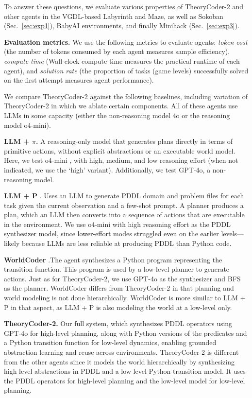 \documentclass{article}
\theoremstyle{plain}
\theoremstyle{definition}
\theoremstyle{remark}
\begin{document}
To answer these questions, we evaluate various properties of TheoryCoder-2 and other agents in the VGDL-based Labyrinth and Maze, as well as Sokoban (Sec.~\ref{sec:exp1}), BabyAI  environments, and finally Minihack (Sec.~\ref{sec:exp3}).

\textbf{Evaluation metrics.} We use the following metrics to evaluate agents:
\textit{token cost} (the number of tokens consumed by each agent measures sample efficiency),  \textit{compute time} (Wall-clock compute time measures the practical runtime of each agent), and \textit{solution rate} (the proportion of tasks (game levels) successfully solved on the first attempt measures agent performance).

We compare TheoryCoder-2 against the following baselines, including variation of TheoryCoder-2 in which we ablate certain components.
All of these agents use LLMs in some capacity (either the non-reasoning model 4o or the reasoning model o4-mini).

\textbf{LLM + \textbf{$\pi$}.} A reasoning-only model that generates plans directly in terms of primitive actions, without explicit abstractions or an executable world model. Here, we test o4-mini \citep{openai_o4mini_system_card_2025}, with high, medium, and low reasoning effort (when not indicated, we use the `high' variant). Additionally, we test GPT-4o, a non-reasoning model.

\textbf{LLM + P} \citep{liu2023llm+}. Uses an LLM to generate PDDL domain and problem files for each task given the current observation and a few-shot prompt. A planner produces a plan, which an LLM then converts into a sequence of actions that are executable in the environment. We use o4-mini with high reasoning effort as the PDDL synthesizer model, since lower-effort modes struggled even on the earlier levels—likely because LLMs are less reliable at producing PDDL than Python code.

\textbf{WorldCoder} \citep{tang2024worldcoder}.The agent synthesizes a Python program representing the transition function. This program is used by a low-level planner to generate actions. Just as for TheoryCoder-2, we use GPT-4o as the synthesizer and BFS as the planner. WorldCoder differs from TheoryCoder-2 in that planning and world modeling is not done hierarchically. WorldCoder is more similar to LLM + P in that aspect, as LLM + P is also modeling the world at a low-level only.

\textbf{TheoryCoder-2.} Our full system, which synthesizes PDDL operators using GPT-4o for high-level planning, along with Python versions of the predicates and a Python transition function for low-level dynamics, enabling grounded abstraction learning and reuse across environments.
TheoryCoder-2 is different from the other agents since it models the world hierarchically by synthesizing high level abstractions in PDDL and a low-level Python transition model. It uses the PDDL operators for high-level planning and the low-level model for low-level planning.
\end{document}
